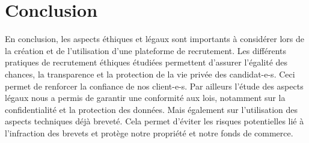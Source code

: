 \section{Conclusion} 
En conclusion, les aspects éthiques et légaux sont importants à considérer lors de la création et de l'utilisation d'une plateforme de recrutement.
Les différents pratiques de recrutement éthiques étudiées permettent d’assurer l'égalité des chances, la transparence et la protection de la vie privée des candidat-e-s.
Ceci permet de renforcer la confiance de nos client-e-s.
Par ailleurs l’étude des aspects légaux nous a permis de garantir une conformité aux lois,
 notamment sur la confidentialité et la protection des données. Mais également sur l’utilisation des aspects techniques déjà breveté. Cela  
permet d’éviter les risques potentielles lié à l’infraction des brevets et protège notre propriété et notre fonds de commerce.
